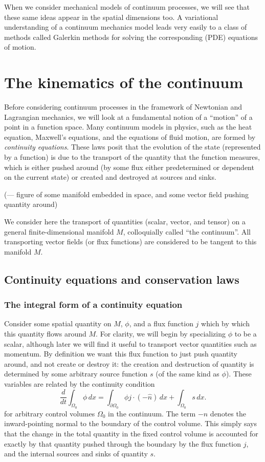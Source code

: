 \documentclass[11pt,a4paper]{memoir}
\begin{document}
When we consider mechanical models of continuum processes, we will see that these same ideas appear in the spatial dimensions too.
A variational understanding of a continuum mechanics model leads very easily to a class of methods called Galerkin methods for solving
the corresponding (PDE) equations of motion.


\section{The kinematics of the continuum} %

Before considering continuum processes in the framework of Newtonian and Lagrangian mechanics, we will look at a fundamental notion of a ``motion''
of a point in a function space. Many continuum models in physics, such as the heat equation,
Maxwell's equations, and the equations of fluid motion, are formed by \textit{continuity equations}. These laws posit that the
evolution of the state (represented by a function) is
due to the transport of the quantity that the function measures, which is either pushed around (by some flux either predetermined or dependent on the current state)
or created and destroyed at sources and sinks.

(--- figure of some manifold embedded in space, and some vector field pushing quantity around)

We consider here the transport of quantities (scalar, vector, and tensor) on a general finite-dimensional manifold $M$,
colloquially called ``the continuum''. All transporting vector fields (or flux functions) are considered to be tangent to this manifold $M$.

\subsection{Continuity equations and conservation laws}
\subsubsection{The integral form of a continuity equation}
Consider some spatial quantity on $M$, $\phi$, and a flux function $j$ which by which
this quantity flows around $M$. For clarity, we will begin by specializing $\phi$ to be a scalar, although later we will find it useful to
transport vector quantities such as momentum. By definition we want this flux function to just push quantity around, and not create or destroy it:
the creation and destruction of quantity is determined by some arbitrary source function $s$ (of the same kind as $\phi$). These variables are related by the continuity
condition
\begin{equation}\label{continuity_equation}
    \frac{d}{dt} \int_{\Omega_0} \phi\,dx = \int_{\partial\Omega_0} \phi j\cdot (-\hat{n})\,dx + \int_{\Omega_0} s\,dx.
\end{equation}
for arbitrary control volumes $\Omega_0$ in the continuum. The term $-\hat{n}$ denotes the inward-pointing normal to the boundary of the control volume. This simply says that the change in the total quantity in the fixed control volume
is accounted for exactly by that quantity pushed through the boundary by the flux function $j$, and the internal sources and sinks of quantity $s$.
\end{document}
